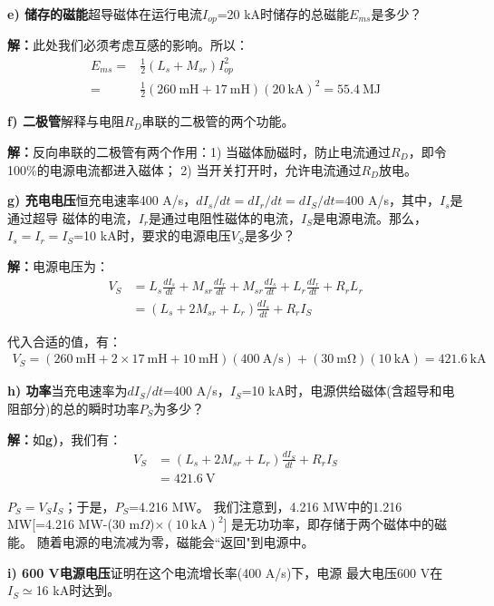 \textbf{e) 储存的磁能}\qquad 超导磁体在运行电流$I_{op}$=20 kA时储存的总磁能$E_{ms}$是多少？

\textbf{解：}此处我们必须考虑互感的影响。所以：
\begin{align*}%
E_{ms}=&\frac{1}{2}(L_s+M_{sr})I_{op}^2\\
=&\frac{1}{2}(260\ \mathrm{mH}+17\ \mathrm{mH})(20\ \mathrm{kA})^2=55.4\ \mathrm{MJ}
\end{align*}

\textbf{f) 二极管}\qquad 解释与电阻$R_D$串联的二极管的两个功能。

\textbf{解：}反向串联的二极管有两个作用：1) 当磁体励磁时，防止电流通过$R_D$，即令100\%的电源电流都进入磁体；
2) 当开关打开时，允许电流通过$R_D$放电。

\textbf{g) 充电电压}\qquad 恒充电速率400 A/s，$dI_s/dt=dI_r/dt=dI_S/dt$=400 A/s，其中，$I_s$是通过超导
磁体的电流，$I_r$是通过电阻性磁体的电流，$I_S$是电源电流。那么，$I_s=I_r=I_S$=10 kA时，要求的电源电压$V_S$是多少？

\textbf{解：}电源电压为：
\begin{align*}%
V_S&=L_s\frac{dI_s}{dt}+M_{sr}\frac{dI_r}{dt}+M_{sr}\frac{dI_s}{dt}+L_r\frac{dI_r}{dt}+R_rL_r\\
&=(L_s+2M_{sr}+L_r)\frac{dI_s}{dt}+R_rI_S \tag{g.1}
\end{align*}

代入合适的值，有：
\begin{align*}%
V_S=(260\ \mathrm{mH}+2\times17\ \mathrm{mH}+10\ \mathrm{mH})(400\ \mathrm{A/s})+(30\ \mathrm{m\Omega})(10\ \mathrm{kA})=421.6\ \mathrm{kA}
\end{align*}

\textbf{h) 功率}\qquad 当充电速率为$dI_S/dt$=400 A/s，$I_S$=10 kA时，电源供给磁体(含超导和电阻部分)的总的瞬时功率$P_S$为多少？

\textbf{解：}如\textbf{g)}，我们有：
\begin{align*}%
V_S&=(L_s+2M_{sr}+L_r)\frac{dI_S}{dt}+R_rI_S\\ \tag{g.1}
&=421.6\ \mathrm{V}
\end{align*}

$P_S=V_S I_S$；于是，$P_S$=4.216 MW。
我们注意到，4.216 MW中的1.216 MW[=4.216 MW-(30 m$\Omega$)$\times(10\ \mathrm{kA})^2$]
是无功功率，即存储于两个磁体中的磁能。
随着电源的电流减为零，磁能会``返回"到电源中。

\textbf{i) 600 V电源电压}\qquad 证明在这个电流增长率(400 A/s)下，电源
最大电压600 V在$I_S\simeq$16 kA时达到。

